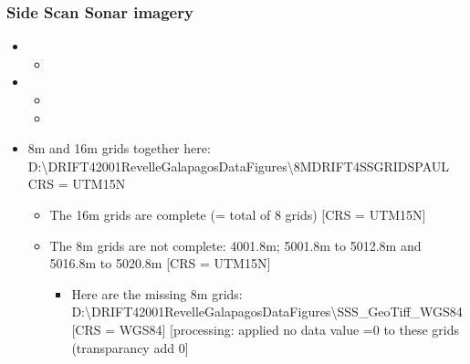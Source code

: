 \documentclass[letterpaper,10pt,english]{sphinxmanual}
\begin{document}
\subsubsection{Side Scan Sonar imagery}
\label{\detokenize{02_folder_hierarchy:side-scan-sonar-imagery}}\begin{itemize}
\item {} 
\sphinxAtStartPar
{}
\begin{itemize}
\item {} 
\sphinxAtStartPar
{}

\end{itemize}

\item {} 
\sphinxAtStartPar
{}
\begin{itemize}
\item {} 
\sphinxAtStartPar
{}

\item {} 
\sphinxAtStartPar
{}

\end{itemize}

\item {} 
\sphinxAtStartPar
8m and 16m grids together here: D:\textbackslash{}DRIFT4\sphinxhyphen{}2001\sphinxhyphen{}Revelle\sphinxhyphen{}Galapagos\sphinxhyphen{}Data\sphinxhyphen{}Figures\textbackslash{}8M\sphinxhyphen{}DRIFT4\sphinxhyphen{}SS\sphinxhyphen{}GRIDS\sphinxhyphen{}PAUL CRS = UTM15N
\begin{itemize}
\item {} 
\sphinxAtStartPar
The 16m grids are complete (= total of 8 grids) {[}CRS = UTM15N{]}

\item {} 
\sphinxAtStartPar
The 8m grids are not complete: 40\sphinxhyphen{}01.8m; 50\sphinxhyphen{}01.8m to 50\sphinxhyphen{}12.8m and 50\sphinxhyphen{}16.8m to 50\sphinxhyphen{}20.8m {[}CRS = UTM15N{]}
\begin{itemize}
\item {} 
\sphinxAtStartPar
Here are the missing 8m grids: D:\textbackslash{}DRIFT4\sphinxhyphen{}2001\sphinxhyphen{}Revelle\sphinxhyphen{}Galapagos\sphinxhyphen{}Data\sphinxhyphen{}Figures\textbackslash{}SSS\_GeoTiff\_WGS84 {[}CRS = WGS84{]} {[}processing: applied no data value =0 to these grids (transparancy add 0{]}


\end{itemize}
\end{itemize}
\end{itemize}
\end{document}
